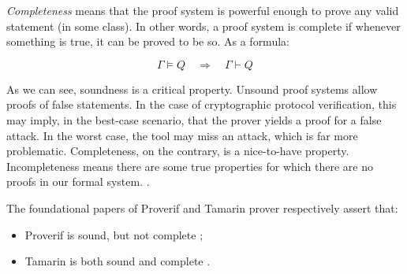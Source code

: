\textit{Completeness} means that the proof system is powerful enough to prove any valid statement (in some class). In other words, a proof system is complete if whenever something is true, it can be proved to be so. As a formula:

\begin{equation}
    \Gamma \models Q \quad \Longrightarrow \quad \Gamma \vdash Q
\end{equation}

As we can see, soundness is a critical property. Unsound proof systems allow proofs of false statements. In the case of cryptographic protocol verification, this may imply, in the best-case scenario, that the prover yields a proof for a false attack. In the worst case, the tool may miss an attack, which is far more problematic.
Completeness, on the contrary, is a nice-to-have property. Incompleteness means there are some true properties for which there are no proofs in our formal system. \cite{slides_on_sound_complete}.

The foundational papers of Proverif and Tamarin prover respectively assert that:
\begin{itemize}
    \item Proverif is sound, but not complete \cite{ProverifManual};
    \item Tamarin is both sound and complete \cite{TamarinFoundations, TamarinFoundationsExtended, xor_tamarin}.
\end{itemize}

